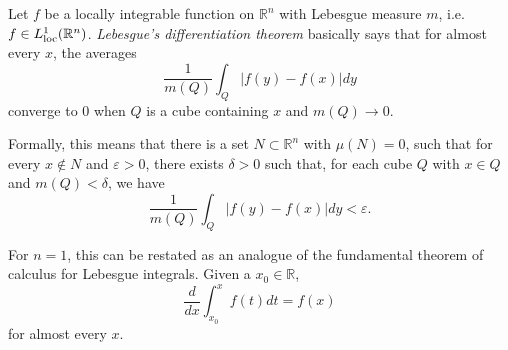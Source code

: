 \documentclass[12pt]{article}
\begin{document}
Let $f$ be a locally integrable function on $\mathbb{R}^n$ with Lebesgue measure $m$, i.e. $f\in L^1_\textnormal{loc}(\mathbb{R}^n)$. \emph{Lebesgue's differentiation theorem} basically says that for almost every $x$, the averages 
\[\frac{1}{m(Q)}\int_Q |f(y)-f(x)|dy\]
converge to $0$ when $Q$ is a cube containing $x$ and $m(Q)\rightarrow 0$. 

Formally, this means that there is a set $N\subset \mathbb{R}^n$ with $\mu(N)=0$, such that for every $x\notin N$ and $\varepsilon>0$, there exists 
$\delta>0$ such that, for each cube $Q$ with $x\in Q$ and $m(Q)<\delta$, we have
\[\frac{1}{m(Q)}\int_Q|f(y)-f(x)|dy<\varepsilon.\]

For $n=1$, this can be restated as an analogue of the fundamental theorem of calculus for Lebesgue integrals. Given a $x_0\in \mathbb{R}$,
\[\frac{d}{dx}\int_{x_0}^x f(t)dt = f(x)\]
for almost every $x$.
\end{document}
